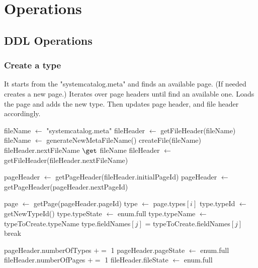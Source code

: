 \documentclass{article}
\begin{document}
\section{Operations}

\subsection{DDL Operations}

\subsubsection{Create a type}
It starts from the "systemcatalog.meta" and finds an available page. (If needed creates a new page.) Iterates over page headers until find an available one. Loads the page and adds the new type. Then updates page header, and file header accordingly.

\begin{algorithm}[H]
    
    {
        fileName $\gets$ "systemcatalog.meta"\;
        fileHeader $\gets$ getFileHeader(fileName)\;
        {
            {
                fileName $\gets$ generateNewMetaFileName()\;
                createFile(fileName)\;
                fileHeader.nextFileName $\get$ fileName\;
            }
            fileHeader $\gets$ getFileHeader(fileHeader.nextFileName)\;
        }
        
        pageHeader $\gets$ getPageHeader(fileHeader.initialPageId)\;
        {
            pageHeader $\gets$ getPageHeader(pageHeader.nextPageId)\;
        }
        
        page $\gets$ getPage(pageHeader.pageId)\;
        {
            {
                type $\gets$ page.types$[i]$\;
                type.typeId $\gets$ getNewTypeId()\;
                type.typeState $\gets$ enum.full\;
                type.typeName $\gets$ typeToCreate.typeName
                {
                    type.fieldNames$[j]$ = typeToCreate.fieldNames$[j]$\;
                }
                break
            }
        }
        
        pageHeader.numberOfTypes $+=$ 1 \;
        {
            pageHeader.pageState $\gets$ enum.full\;
            fileHeader.numberOfPages $+=$ 1\;
            {
                fileHeader.fileState $\gets$ enum.full\;
            }
        }
        
    }
\end{algorithm}
\newpage
\end{document}
